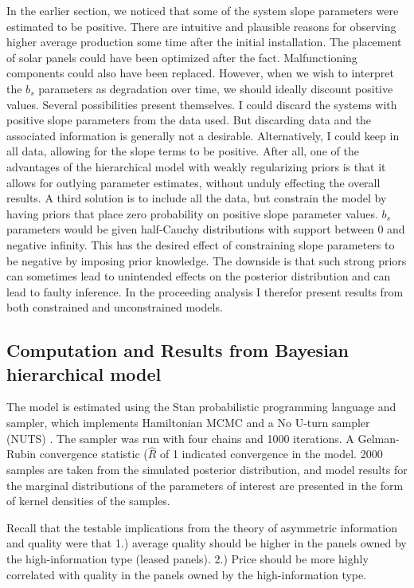 \documentclass[a4paper]{article}
\begin{document}
In the earlier section, we noticed that some of the system slope parameters were estimated to be positive. There are intuitive and plausible reasons for observing higher average production some time after the initial installation. The placement of solar panels could have been optimized after the fact. Malfunctioning components could also have been replaced. However, when we wish to interpret the $b_s$ parameters as degradation over time, we should ideally discount positive values. Several possibilities present themselves. I could discard the systems with positive slope parameters from the data used. But discarding data and the associated information is generally not a desirable. Alternatively, I could keep in all data, allowing for the slope terms to be positive. After all, one of the advantages of the hierarchical model with weakly regularizing priors is that it allows for outlying parameter estimates, without unduly effecting the overall results. A third solution is to include all the data, but constrain the model by having priors that place zero probability on positive slope parameter values. $b_s$ parameters would be given half-Cauchy distributions with support between 0 and negative infinity. This has the desired effect of constraining slope parameters to be negative by imposing prior knowledge. The downside is that such strong priors can sometimes lead to unintended effects on the posterior distribution and can lead to faulty inference. In the proceeding analysis I therefor present results from both constrained and unconstrained models.

\subsection{Computation and Results from Bayesian hierarchical model}

The model is estimated using the Stan probabilistic programming language and sampler, which implements Hamiltonian MCMC and a No U-turn sampler (NUTS) \citep{stan_development_team_stan_2014}. The sampler was run with four chains and 1000 iterations. A Gelman-Rubin convergence statistic ($\hat{R}$ of 1 indicated convergence in the model. 2000 samples are taken from the simulated posterior distribution, and model results for the marginal distributions of the parameters of interest are presented in the form of kernel densities of the samples.

Recall that the testable implications from the theory of asymmetric information and quality were that 1.) average quality should be higher in the panels owned by the high-information type (leased panels). 2.) Price should be more highly correlated with quality in the panels owned by the high-information type.
\end{document}
